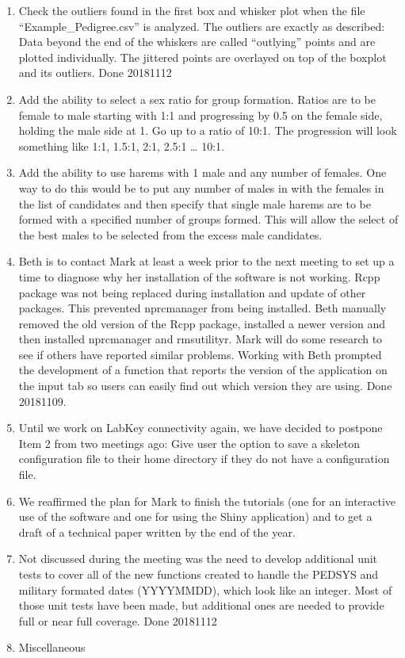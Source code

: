 \documentclass[
]{article}
\providecommand{\tightlist}{%
  \setlength{\itemsep}{0pt}\setlength{\parskip}{0pt}}
\begin{document}
\begin{enumerate}
\def\labelenumi{\arabic{enumi}.}
\setcounter{enumi}{2}
\tightlist
\item
  Check the outliers found in the first box and whisker plot when the
  file ``Example\_Pedigree.csv'' is analyzed. The outliers are exactly
  as described: Data beyond the end of the whiskers are called
  ``outlying'' points and are plotted individually. The jittered points
  are overlayed on top of the boxplot and its outliers. Done 20181112
\item
  Add the ability to select a sex ratio for group formation. Ratios are
  to be female to male starting with 1:1 and progressing by 0.5 on the
  female side, holding the male side at 1. Go up to a ratio of 10:1. The
  progression will look something like 1:1, 1.5:1, 2:1, 2.5:1 \ldots{}
  10:1.
\item
  Add the ability to use harems with 1 male and any number of females.
  One way to do this would be to put any number of males in with the
  females in the list of candidates and then specify that single male
  harems are to be formed with a specified number of groups formed. This
  will allow the select of the best males to be selected from the excess
  male candidates.
\item
  Beth is to contact Mark at least a week prior to the next meeting to
  set up a time to diagnose why her installation of the software is not
  working. Rcpp package was not being replaced during installation and
  update of other packages. This prevented nprcmanager from being
  installed. Beth manually removed the old version of the Rcpp package,
  installed a newer version and then installed nprcmanager and
  rmsutilityr. Mark will do some research to see if others have reported
  similar problems. Working with Beth prompted the development of a
  function that reports the version of the application on the input tab
  so users can easily find out which version they are using. Done
  20181109.
\item
  Until we work on LabKey connectivity again, we have decided to
  postpone Item 2 from two meetings ago: Give user the option to save a
  skeleton configuration file to their home directory if they do not
  have a configuration file.
\item
  We reaffirmed the plan for Mark to finish the tutorials (one for an
  interactive use of the software and one for using the Shiny
  application) and to get a draft of a technical paper written by the
  end of the year.
\item
  Not discussed during the meeting was the need to develop additional
  unit tests to cover all of the new functions created to handle the
  PEDSYS and military formated dates (YYYYMMDD), which look like an
  integer. Most of those unit tests have been made, but additional ones
  are needed to provide full or near full coverage. Done 20181112
\item
  Miscellaneous
\end{enumerate}
\end{document}

